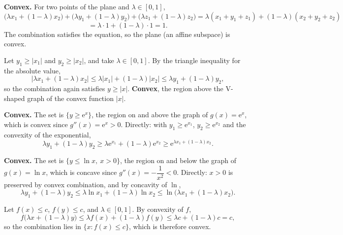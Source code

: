 \begin{solutions}
  \item \textbf{Convex.} For two points of the plane and $\lambda\in[0,1]$,
        \[
          \bigl(\lambda x_{1}+(1-\lambda)x_{2}\bigr)
          +\bigl(\lambda y_{1}+(1-\lambda)y_{2}\bigr)
          +\bigl(\lambda z_{1}+(1-\lambda)z_{2}\bigr)
          =\lambda(x_{1}+y_{1}+z_{1})+(1-\lambda)(x_{2}+y_{2}+z_{2})
        \]
        \[
          =\lambda\cdot 1+(1-\lambda)\cdot 1=1 .
        \]
        The combination satisfies the equation, so the plane (an affine
        subspace) is convex.

  \item Let $y_{1}\ge |x_{1}|$ and $y_{2}\ge |x_{2}|$, and take
        $\lambda\in[0,1]$. By the triangle inequality for the absolute
        value,
        \[
          \bigl|\lambda x_{1}+(1-\lambda)x_{2}\bigr|
          \le \lambda|x_{1}|+(1-\lambda)|x_{2}|
          \le \lambda y_{1}+(1-\lambda)y_{2} ,
        \]
        so the combination again satisfies $y\ge|x|$. \textbf{Convex},
        the region above the V-shaped graph of the convex function $|x|$.

  \item \textbf{Convex.} The set is $\{y\ge \mathrm{e}^{x}\}$, the region
        on and above the graph of $g(x)=\mathrm{e}^{x}$, which is convex
        since $g''(x)=\mathrm{e}^{x}>0$. Directly: with $y_{1}\ge
        \mathrm{e}^{x_{1}}$, $y_{2}\ge \mathrm{e}^{x_{2}}$ and the
        convexity of the exponential,
        \[
          \lambda y_{1}+(1-\lambda)y_{2}
          \ge \lambda \mathrm{e}^{x_{1}}+(1-\lambda)\mathrm{e}^{x_{2}}
          \ge \mathrm{e}^{\lambda x_{1}+(1-\lambda)x_{2}} .
        \]

  \item \textbf{Convex.} The set is $\{y\le \ln x,\ x>0\}$, the region on
        and below the graph of $g(x)=\ln x$, which is concave since
        $g''(x)=-\dfrac{1}{x^{2}}<0$. Directly: $x>0$ is preserved by
        convex combination, and by concavity of $\ln$,
        \[
          \lambda y_{1}+(1-\lambda)y_{2}
          \le \lambda \ln x_{1}+(1-\lambda)\ln x_{2}
          \le \ln\bigl(\lambda x_{1}+(1-\lambda)x_{2}\bigr) .
        \]

  \item Let $f(x)\le c$, $f(y)\le c$, and $\lambda\in[0,1]$. By convexity
        of $f$,
        \[
          f\bigl(\lambda x+(1-\lambda)y\bigr)
          \le \lambda f(x)+(1-\lambda)f(y)
          \le \lambda c+(1-\lambda)c=c ,
        \]
        so the combination lies in $\{x: f(x)\le c\}$, which is therefore
        convex.


\end{solutions}
